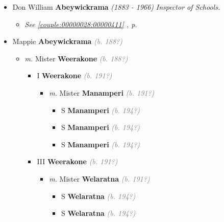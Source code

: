 \documentclass[10pt, openany]{book}
\begin{document}
\begin{itemize}
{\begin{itemize}
{\begin{itemize}
{\begin{itemize}
{ }
\end{itemize}}
\end{itemize}
  }
\item{Don William \textbf{Abeywickrama} \textcolor{slorange}{\textit{(1883 - 1966)}} \textcolor{slmaroon}{\textit{Inspector of Schools.}}
\begin{itemize}
\item{\textcolor{slteal}{\textit{See  \autoref{couple:00000028:00000411} \textit{, p. \pageref{couple:00000028:00000411} }}}}
\end{itemize}
  }
\item{Mappie \textbf{Abeywickrama} \textcolor{gray}{\textit{(b. 188?)}}
\begin{itemize}
\item{\textit{m.} Mister \textbf{Weerakone} \textcolor{gray}{\textit{(b. 188?)}}   \label{couple:00000042:00000928} \begin{itemize}
\item{I \textbf{Weerakone} \textcolor{gray}{\textit{(b. 191?)}}
\begin{itemize}
\item{\textit{m.} Mister \textbf{Manamperi} \textcolor{gray}{\textit{(b. 191?)}}   \label{couple:00000523:00000924} \begin{itemize}
\item{S \textbf{Manamperi} \textcolor{gray}{\textit{(b. 194?)}}
 }
\item{S \textbf{Manamperi} \textcolor{gray}{\textit{(b. 194?)}}
 }
\item{S \textbf{Manamperi} \textcolor{gray}{\textit{(b. 194?)}}
 }
\end{itemize}}
\end{itemize}
 }
\item{III \textbf{Weerakone} \textcolor{gray}{\textit{(b. 191?)}}
\begin{itemize}
\item{\textit{m.} Mister \textbf{Welaratna} \textcolor{gray}{\textit{(b. 191?)}}   \label{couple:00000926:00000951} \begin{itemize}
\item{S \textbf{Welaratna} \textcolor{gray}{\textit{(b. 194?)}}
 }
\item{S \textbf{Welaratna} \textcolor{gray}{\textit{(b. 194?)}}
}
\end{itemize}}
\end{itemize}}
\end{itemize}}
\end{itemize}}
\end{itemize}}
\end{itemize}
\end{document}
